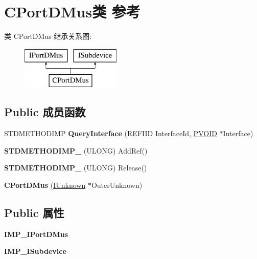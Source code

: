 \hypertarget{class_c_port_d_mus}{}\section{C\+Port\+D\+Mus类 参考}
\label{class_c_port_d_mus}
类 C\+Port\+D\+Mus 继承关系图\+:\begin{figure}[H]
\begin{center}
\leavevmode
\includegraphics[height=2.000000cm]{class_c_port_d_mus}
\end{center}
\end{figure}
\subsection*{Public 成员函数}
\begin{DoxyCompactItemize}
\item 
\mbox{\label{class_c_port_d_mus_aa07808b5cb34dad50705daae12aeefb1}} 
S\+T\+D\+M\+E\+T\+H\+O\+D\+I\+MP {\bfseries Query\+Interface} (R\+E\+F\+I\+ID Interface\+Id, \hyperlink{interfacevoid}{P\+V\+O\+ID} $\ast$Interface)
\item 
\mbox{\label{class_c_port_d_mus_a450a9624a74cd089e87ffd8a0aeccafb}} 
{\bfseries S\+T\+D\+M\+E\+T\+H\+O\+D\+I\+M\+P\+\_\+} (U\+L\+O\+NG) Add\+Ref()
\item 
\mbox{\label{class_c_port_d_mus_a4f4d39ae8919a80587fbd7b8c1b5ee3b}} 
{\bfseries S\+T\+D\+M\+E\+T\+H\+O\+D\+I\+M\+P\+\_\+} (U\+L\+O\+NG) Release()
\item 
\mbox{\label{class_c_port_d_mus_adf95b1f865bde4bd2bbafc5d44116752}} 
{\bfseries C\+Port\+D\+Mus} (\hyperlink{interface_i_unknown}{I\+Unknown} $\ast$Outer\+Unknown)
\end{DoxyCompactItemize}
\subsection*{Public 属性}
\begin{DoxyCompactItemize}
\item 
\mbox{\label{class_c_port_d_mus_ab2b52786cb3d6b9403965f3131e7273b}} 
{\bfseries I\+M\+P\+\_\+\+I\+Port\+D\+Mus}
\item 
\mbox{\label{class_c_port_d_mus_a54d3916db53d47d2909a458bf4444c16}} 
{\bfseries I\+M\+P\+\_\+\+I\+Subdevice}
\end{DoxyCompactItemize}
